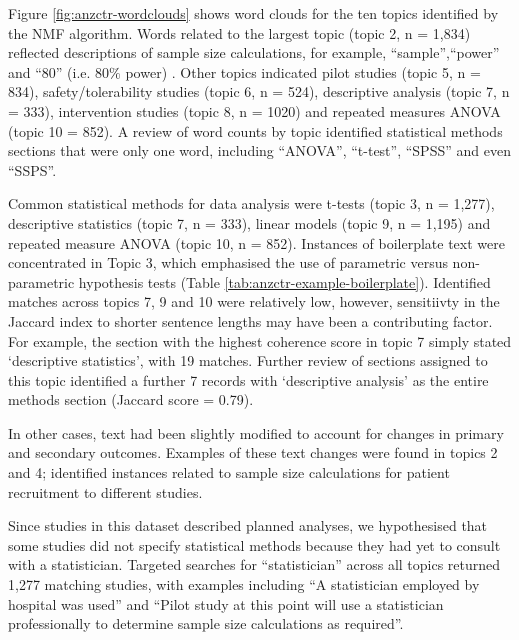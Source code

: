 \documentclass[12pt]{article}
\begin{document}
Figure \ref{fig:anzctr-wordclouds} shows word clouds for the ten topics identified by the NMF algorithm. 
Words related to the largest topic (topic 2, n = 1,834) reflected descriptions of sample size calculations, for example, ``sample'',``power'' and ``80'' (i.e. $80\%$ power) . Other topics indicated pilot studies (topic 5, n = 834),
safety/tolerability studies (topic 6, n = 524), descriptive analysis (topic 7, n = 333),
intervention studies (topic 8, n = 1020) and repeated measures ANOVA (topic 10 = 852). A review of word counts by topic 
identified statistical methods sections that were only one word, including ``ANOVA'',
``t-test'', ``SPSS'' and even ``SSPS''.

Common statistical methods for data analysis were t-tests (topic 3, n = 1,277), descriptive statistics (topic 7, n = 333), linear models (topic 9, n = 1,195) and repeated measure ANOVA (topic 10, n = 852).
Instances of boilerplate text were concentrated in Topic 3, which emphasised the use of parametric versus non-parametric hypothesis tests (Table \ref{tab:anzctr-example-boilerplate}). Identified matches across topics 7, 9 and 10 were
relatively low, however, sensitiivty in the Jaccard index to shorter sentence lengths may have been a contributing factor. For example, the section with the highest coherence score in topic 7 simply stated `descriptive statistics', with 19 matches. Further review of 
sections assigned to this topic identified a further 7 records with `descriptive analysis' as the entire methods section (Jaccard score = 0.79).

In other cases, text had been slightly modified to account for changes
in primary and secondary outcomes. Examples of these text changes were
found in topics 2 and 4; identified instances
related to sample size calculations for patient recruitment to different
studies.

Since studies in this dataset described planned analyses, we
hypothesised that some studies did not specify statistical methods because
they had yet to consult with a statistician. Targeted searches for ``statistician'' across all topics returned 1,277 matching studies,
with examples including ``A statistician employed by hospital was used''
and ``Pilot study at this point will use a statistician professionally
to determine sample size calculations as required''.
\end{document}
